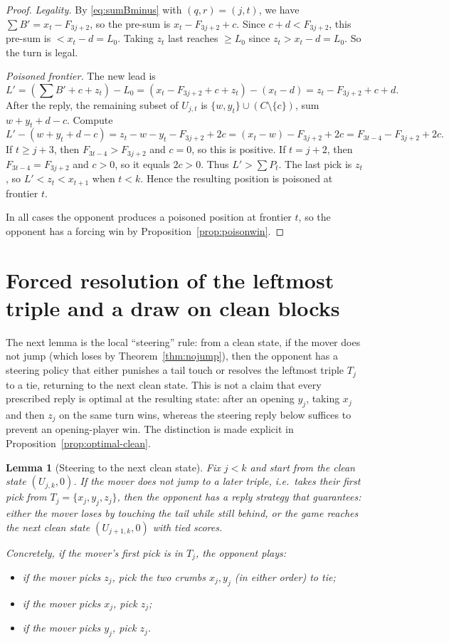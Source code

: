 \documentclass[11pt]{article}
\newtheorem{lemma}[theorem]{Lemma}
\begin{document}
\begin{proof}
\emph{Legality.}
By \eqref{eq:sumBminus} with $(q,r)=(j,t)$, we have $\sum B'=x_t-F_{3j+2}$, so the pre-sum is $x_t-F_{3j+2}+c$.
Since $c+d<F_{3j+2}$, this pre-sum is $<x_t-d=L_0$. Taking $z_t$ last reaches $\ge L_0$ since $z_t>x_t-d=L_0$.
So the turn is legal.

\emph{Poisoned frontier.}
The new lead is
\[
L'=(\sum B'+c+z_t)-L_0=(x_t-F_{3j+2}+c+z_t)-(x_t-d)=z_t-F_{3j+2}+c+d.
\]
After the reply, the remaining subset of $U_{j,t}$ is $\{w,y_t\}\cup(C\setminus\{c\})$, sum $w+y_t+d-c$.
Compute
\[
L'-(w+y_t+d-c)= z_t-w-y_t-F_{3j+2}+2c = (x_t-w)-F_{3j+2}+2c = F_{3t-4}-F_{3j+2}+2c.
\]
If $t\ge j+3$, then $F_{3t-4}>F_{3j+2}$ and $c=0$, so this is positive.
If $t=j+2$, then $F_{3t-4}=F_{3j+2}$ and $c>0$, so it equals $2c>0$.
Thus $L'>\sum P_t$. The last pick is $z_t$, so $L'<z_t<x_{t+1}$ when $t<k$.
Hence the resulting position is poisoned at frontier $t$.

\medskip
In all cases the opponent produces a poisoned position at frontier $t$, so the opponent has a forcing win by Proposition~\ref{prop:poisonwin}.
\end{proof}

\section{Forced resolution of the leftmost triple and a draw on clean blocks}

The next lemma is the local ``steering'' rule: from a clean state, if the mover does not jump (which loses by Theorem~\ref{thm:nojump}),
then the opponent has a steering policy that either punishes a tail touch or resolves the leftmost
triple $T_j$ to a tie, returning to the next clean state. This is not a claim that every prescribed
reply is optimal at the resulting state: after an opening $y_j$, taking $x_j$ and then $z_j$
on the same turn wins, whereas the steering reply below suffices to prevent an opening-player win.
The distinction is made explicit in Proposition~\ref{prop:optimal-clean}.

\begin{lemma}[Steering to the next clean state]\label{lem:steer}
Fix $j<k$ and start from the clean state $(U_{j,k},0)$.
If the mover does not jump to a later triple, i.e.\ takes their first pick from $T_j=\{x_j,y_j,z_j\}$, then the opponent has a reply strategy that guarantees:
either the mover loses by touching the tail while still behind, or the game reaches the next clean state $(U_{j+1,k},0)$ with tied scores.

Concretely, if the mover's first pick is in $T_j$, the opponent plays:
\begin{itemize}
\item if the mover picks $z_j$, pick the two crumbs $x_j,y_j$ (in either order) to tie;
\item if the mover picks $x_j$, pick $z_j$;
\item if the mover picks $y_j$, pick $z_j$.
\end{itemize}
\end{lemma}
\end{document}
